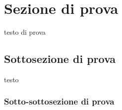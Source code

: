 \section{Sezione di prova}
testo di prova
\subsection{Sottosezione di prova}
testo
\subsubsection{Sotto-sottosezione di prova}